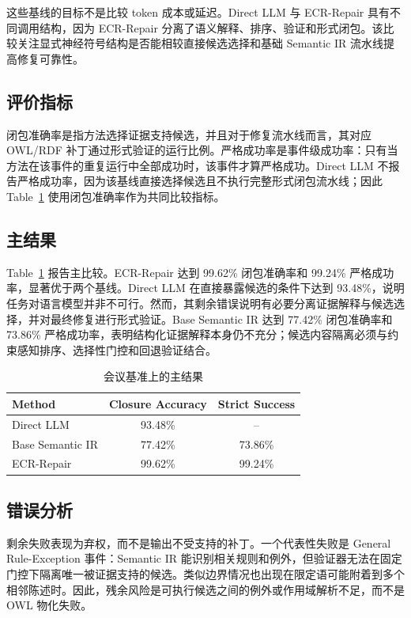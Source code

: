 \documentclass[conference]{IEEEtran}
\begin{document}
这些基线的目标不是比较 token 成本或延迟。Direct LLM 与 ECR-Repair 具有不同调用结构，因为 ECR-Repair 分离了语义解释、排序、验证和形式闭包。该比较关注显式神经符号结构是否能相较直接候选选择和基础 Semantic IR 流水线提高修复可靠性。

\subsection{评价指标}

闭包准确率是指方法选择证据支持候选，并且对于修复流水线而言，其对应 OWL/RDF 补丁通过形式验证的运行比例。严格成功率是事件级成功率：只有当方法在该事件的重复运行中全部成功时，该事件才算严格成功。Direct LLM 不报告严格成功率，因为该基线直接选择候选且不执行完整形式闭包流水线；因此 Table~\ref{tab:main_result} 使用闭包准确率作为共同比较指标。

\subsection{主结果}

Table~\ref{tab:main_result} 报告主比较。ECR-Repair 达到 99.62\% 闭包准确率和 99.24\% 严格成功率，显著优于两个基线。Direct LLM 在直接暴露候选的条件下达到 93.48\%，说明任务对语言模型并非不可行。然而，其剩余错误说明有必要分离证据解释与候选选择，并对最终修复进行形式验证。Base Semantic IR 达到 77.42\% 闭包准确率和 73.86\% 严格成功率，表明结构化证据解释本身仍不充分；候选内容隔离必须与约束感知排序、选择性门控和回退验证结合。

\begin{table}[t]
\centering
\caption{会议基准上的主结果}
\label{tab:main_result}
\begin{tabular}{lcc}
\toprule
Method & Closure Accuracy & Strict Success \\
\midrule
Direct LLM & 93.48\% & -- \\
Base Semantic IR & 77.42\% & 73.86\% \\
ECR-Repair & 99.62\% & 99.24\% \\
\bottomrule
\end{tabular}
\end{table}

\subsection{错误分析}

剩余失败表现为弃权，而不是输出不受支持的补丁。一个代表性失败是 General Rule-Exception 事件：Semantic IR 能识别相关规则和例外，但验证器无法在固定门控下隔离唯一被证据支持的候选。类似边界情况也出现在限定语可能附着到多个相邻陈述时。因此，残余风险是可执行候选之间的例外或作用域解析不足，而不是 OWL 物化失败。
\end{document}
